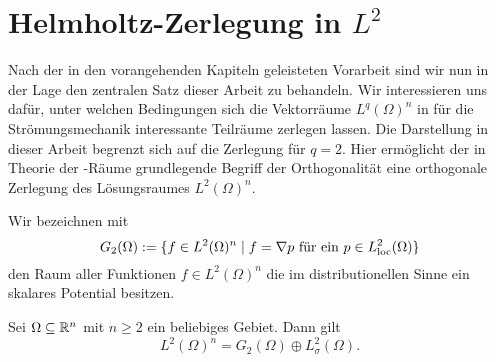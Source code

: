 \chapter{Helmholtz-Zerlegung in $L^2$}

Nach der in den vorangehenden Kapiteln geleisteten Vorarbeit sind wir nun in der Lage den zentralen Satz dieser Arbeit zu behandeln.
Wir interessieren uns dafür, unter welchen Bedingungen sich die Vektorräume $L^q(\Omega)^n$ in für die Strömungsmechanik interessante Teilräume zerlegen lassen.
Die Darstellung in dieser Arbeit begrenzt sich auf die Zerlegung für $q = 2$.
Hier ermöglicht der in Theorie der \hilbert\hyp{}Räume grundlegende Begriff der Orthogonalität eine orthogonale Zerlegung des Lösungsraumes $L^2(\Omega)^n$.

Wir bezeichnen mit 
$$
G_2(\Omega) := \{f \in L^2(\Omega)^n \mid f = \nabla p \text{ für ein } p \in L^2_{\operatorname{loc}}(\Omega)\}
$$
den Raum aller Funktionen $f \in L^2(\Omega)^n$ die im distributionellen Sinne ein skalares Potential besitzen.

\begin{lem}
  \label{lem:helmholtz}
  Sei $\Omega \subseteq \mathbb{R}^n$ mit $n \geq 2$ ein beliebiges Gebiet.
  Dann gilt
  $$
  L^2(\Omega)^n = G_2(\Omega) \oplus L^2_\sigma(\Omega).
  $$
\end{lem}

